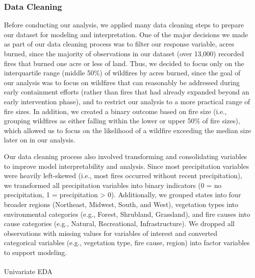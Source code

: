 \documentclass[
  letterpaper,
  DIV=11,
  numbers=noendperiod]{scrartcl}
\makeatletter
\let\oldparagraph\paragraph
\renewcommand{\paragraph}{
    \@ifstar
      \xxxParagraphStar
      \xxxParagraphNoStar
  }
\newcommand{\xxxParagraphStar}[1]{\oldparagraph*{#1}\mbox{}}
\newcommand{\xxxParagraphNoStar}[1]{\oldparagraph{#1}\mbox{}}
\makeatother
\begin{document}
\subsubsection{Data Cleaning}\label{data-cleaning}

Before conducting our analysis, we applied many data cleaning steps to
prepare our dataset for modeling and interpretation. One of the major
decisions we made as part of our data cleaning process was to filter our
response variable, acres burned, since the majority of observations in
our dataset (over 13,000) recorded fires that burned one acre or less of
land. Thus, we decided to focus only on the interquartile range (middle
50\%) of wildfires by acres burned, since the goal of our analysis was
to focus on wildfires that can reasonably be addressed during early
containment efforts (rather than fires that had already expanded beyond
an early intervention phase), and to restrict our analysis to a more
practical range of fire sizes. In addition, we created a binary outcome
based on fire size (i.e., grouping wildfires as either falling within
the lower or upper 50\% of fire sizes), which allowed us to focus on the
likelihood of a wildfire exceeding the median size later on in our
analysis.

Our data cleaning process also involved transforming and consolidating
variables to improve model interpretability and analysis. Since most
precipitation variables were heavily left-skewed (i.e., most fires
occurred without recent precipitation), we transformed all precipitation
variables into binary indicators (0 = no precipitation, 1 =
precipitation \textgreater{} 0). Additionally, we grouped states into
four broader regions (Northeast, Midwest, South, and West), vegetation
types into environmental categories (e.g., Forest, Shrubland,
Grassland), and fire causes into cause categories (e.g., Natural,
Recreational, Infrastructure). We dropped all observations with missing
values for variables of interest and converted categorical variables
(e.g., vegetation type, fire cause, region) into factor variables to
support modeling.

\paragraph{Univariate EDA}\label{univariate-eda}
\end{document}
